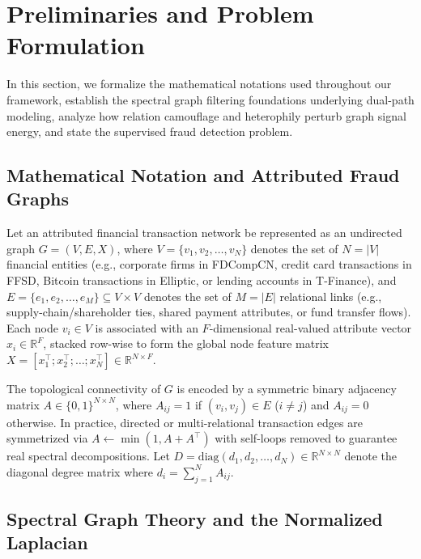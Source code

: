\documentclass[10pt,a4paper,twocolumn]{article}
\begin{document}
\section{Preliminaries and Problem Formulation}

In this section, we formalize the mathematical notations used throughout our framework, establish the spectral graph filtering foundations underlying dual-path modeling, analyze how relation camouflage and heterophily perturb graph signal energy, and state the supervised fraud detection problem.

\subsection{Mathematical Notation and Attributed Fraud Graphs}

Let an attributed financial transaction network be represented as an undirected graph $G = (V, E, X)$, where $V = \{v_1, v_2, \dots, v_N\}$ denotes the set of $N = |V|$ financial entities (e.g., corporate firms in FDCompCN, credit card transactions in FFSD, Bitcoin transactions in Elliptic, or lending accounts in T-Finance), and $E = \{e_1, e_2, \dots, e_M\} \subseteq V \times V$ denotes the set of $M = |E|$ relational links (e.g., supply-chain/shareholder ties, shared payment attributes, or fund transfer flows). Each node $v_i \in V$ is associated with an $F$-dimensional real-valued attribute vector $x_i \in \mathbb{R}^F$, stacked row-wise to form the global node feature matrix $X = [x_1^\top; x_2^\top; \dots; x_N^\top] \in \mathbb{R}^{N \times F}$.

The topological connectivity of $G$ is encoded by a symmetric binary adjacency matrix $A \in \{0, 1\}^{N \times N}$, where $A_{ij} = 1$ if $(v_i, v_j) \in E$ ($i \neq j$) and $A_{ij} = 0$ otherwise. In practice, directed or multi-relational transaction edges are symmetrized via $A \leftarrow \min(1, A + A^\top)$ with self-loops removed to guarantee real spectral decompositions. Let $D = \text{diag}(d_1, d_2, \dots, d_N) \in \mathbb{R}^{N \times N}$ denote the diagonal degree matrix where $d_i = \sum_{j=1}^N A_{ij}$.

\subsection{Spectral Graph Theory and the Normalized Laplacian}
\end{document}
